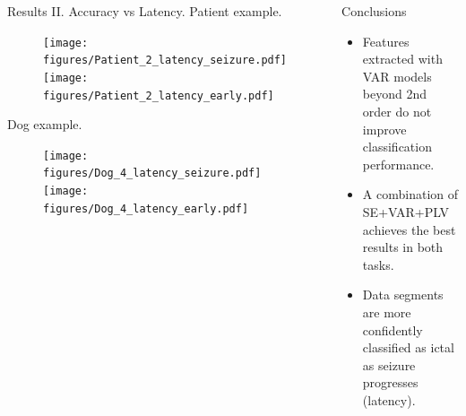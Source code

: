 \documentclass[final,t,overlay, xcolor=table, sans, mathserif]{beamer}
\begin{document}
\begin{frame}{}
\begin{columns}[t]
\begin{column}{.4\linewidth}
\vspace{-1.4cm}
\begin{columns}
\begin{block}{Results II. Accuracy vs Latency.}
Patient example.
\begin{figure}
\texttt{[image: figures/Patient\_2\_latency\_seizure.pdf]}
\texttt{[image: figures/Patient\_2\_latency\_early.pdf]}
\end{figure}
\vspace{-0.8cm}
Dog example.
\begin{figure}
\texttt{[image: figures/Dog\_4\_latency\_seizure.pdf]}
\texttt{[image: figures/Dog\_4\_latency\_early.pdf]}
\end{figure}
\end{block}
\begin{block}{Conclusions}
\begin{itemize}
\item Features extracted with VAR models beyond 2nd order do not improve classification performance.
\item A combination of SE+VAR+PLV achieves the best results in both tasks.
\item Data segments are more confidently classified as ictal as seizure progresses (latency).
\end{itemize}
\end{block}
\end{columns}



\end{column}
\end{columns}


\end{frame}
\end{document}
